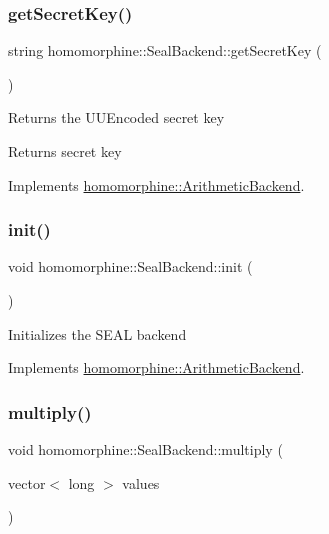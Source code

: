 \subsubsection{\texorpdfstring{getSecretKey()}{getSecretKey()}}
{\footnotesize\ttfamily string homomorphine\+::\+Seal\+Backend\+::get\+Secret\+Key (\begin{DoxyParamCaption}{ }\end{DoxyParamCaption})\hspace{0.3cm}{\ttfamily [virtual]}}

Returns the U\+U\+Encoded secret key

\begin{DoxyReturn}{Returns}
secret key 
\end{DoxyReturn}


Implements \mbox{\hyperlink{classhomomorphine_1_1_arithmetic_backend_a679abf60fea83922f7972498c4500252}{homomorphine\+::\+Arithmetic\+Backend}}.

\mbox{\label{classhomomorphine_1_1_seal_backend_a106556100ae5f2e9dadfa9fc64603d94}} 
\subsubsection{\texorpdfstring{init()}{init()}}
{\footnotesize\ttfamily void homomorphine\+::\+Seal\+Backend\+::init (\begin{DoxyParamCaption}{ }\end{DoxyParamCaption})\hspace{0.3cm}{\ttfamily [virtual]}}

Initializes the S\+E\+AL backend 

Implements \mbox{\hyperlink{classhomomorphine_1_1_arithmetic_backend_a2654ee62a6cf2f16fd41c834a26b0006}{homomorphine\+::\+Arithmetic\+Backend}}.

\mbox{\label{classhomomorphine_1_1_seal_backend_ace0bb8cd6a0e4b22f6e3e7ab00ea1197}} 
\subsubsection{\texorpdfstring{multiply()}{multiply()}\hspace{0.1cm}{\footnotesize\ttfamily [1/2]}}
{\footnotesize\ttfamily void homomorphine\+::\+Seal\+Backend\+::multiply (\begin{DoxyParamCaption}\item[{vector$<$ long $>$}]{values }\end{DoxyParamCaption})\hspace{0.3cm}{\ttfamily [virtual]}}

